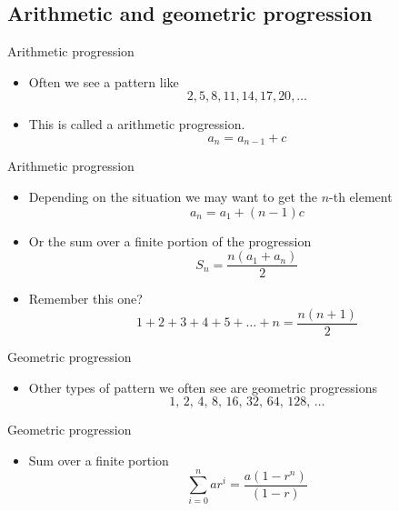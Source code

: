 \documentclass[12pt,t]{beamer}
\newcommand{\bi}{\begin{itemize}}
\newcommand{\ei}{\end{itemize}}
\begin{document}
\subsection{Arithmetic and geometric progression}

\begin{frame}{Arithmetic progression}
  \vspace{30pt}
  \bi
    \item Often we see a pattern like
      \[
        2 , 5 , 8 , 11 , 14, 17, 20, \ldots
      \]
    \item This is called a arithmetic progression.
      \[
        a_n = a_{n-1} + c
      \]
  \ei
\end{frame}

\begin{frame}{Arithmetic progression}
  \vspace{30pt}
  \bi
    \item Depending on the situation we may want to get the $n$-th element
      \[
        a_n = a_1 + (n-1) c
      \]
    \item Or the sum over a finite portion of the progression
      \[
        S_n = \frac{n(a_1 + a_n)}{2}
      \]
    \item Remember this one?
      \[
        1 + 2 + 3 + 4 + 5 + \ldots + n = \frac{n(n+1)}{2}
      \]
  \ei
\end{frame}

\begin{frame}{Geometric progression}
  \vspace{30pt}
  \bi
    \item Other types of pattern we often see are geometric progressions
      \[
        1,\, 2,\, 4,\, 8,\, 16,\, 32,\, 64,\, 128,\, \ldots
      \]
  \ei
\end{frame}

\begin{frame}{Geometric progression}
  \vspace{30pt}
  \bi
    \item Sum over a finite portion
      \[
        \sum_{i = 0}^n ar^i =  \frac{a(1-r^n)}{(1-r)}
      \]
  \ei
\end{frame}
\end{document}

